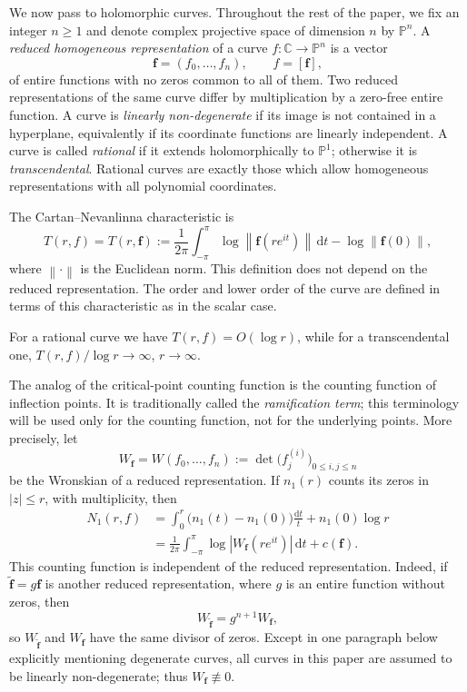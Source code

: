\documentclass[11pt,letterpaper,reqno]{amsart}
\theoremstyle{remark}
\numberwithin{equation}{section}
\newcommand{\C}{\mathbb C}
\newcommand{\PP}{\mathbb P}
\newcommand{\norm}[1]{\left\lVert#1\right\rVert}
\newcommand{\fv}{\bm f}
\begin{document}
We now pass to holomorphic curves. Throughout the rest of the paper,
we fix an integer $n\geq1$ and denote complex projective space of dimension $n$ by $\PP^n$. 
A \emph{reduced homogeneous representation} of a curve
$f:\C\to\PP^{n}$ is a vector
\[
 \fv=(f_0,\ldots,f_n),\qquad f=[\fv],
\]
of entire functions with no zeros common to all of them.
Two reduced representations of
the same curve differ by multiplication by a zero-free entire function.
A curve is \emph{linearly non-degenerate} if its image is not contained in
a hyperplane, equivalently if its coordinate functions are linearly
independent. A curve is called \emph{rational}
if it extends holomorphically to
$\PP^1$; otherwise it is \emph{transcendental}. Rational curves are exactly
those which allow homogeneous representations with all polynomial coordinates.

The Cartan--Nevanlinna characteristic is
\[
 T(r,f)=T(r,\fv):=
 \frac1{2\pi}\int_{-\pi}^{\pi}\log\norm{\fv(re^{it})}\,\mathrm dt
 -\log\norm{\fv(0)},
\]
where $\norm{\cdot}$ is the Euclidean norm. This definition does not
depend on the reduced representation. The order and lower order of the
curve are defined in terms of this characteristic as in the scalar case.

For a rational curve we have $T(r,f)=O(\log r)$, while for a transcendental
one,
$T(r,f)/\log r\to\infty$, $r\to\infty$.

The analog of the critical-point counting function is the counting
function of inflection points. It is traditionally called the \emph{ramification term}; this terminology
will be used only for the counting function, not for the underlying points. More precisely, let
\[
 W_{\fv}=W(f_0,\ldots,f_n)
 :=\det\bigl(f_j^{(i)}\bigr)_{0\leq i,j\leq n}
\]
be the Wronskian of a reduced representation. If $n_1(r)$ counts its zeros
in $|z|\leq r$, with multiplicity, then
\[
 \begin{split}
 N_1(r,f)&=\int_0^r\bigl(n_1(t)-n_1(0)\bigr)\frac{\mathrm dt}{t}
                 +n_1(0)\log r\\
 &=\frac1{2\pi}\int_{-\pi}^{\pi}\log|W_{\fv}(re^{it})|\,\mathrm dt+c(\fv).
 \end{split}
\]
This counting function is independent of the reduced representation.
Indeed, if $\widetilde{\fv}=g\fv$ is another reduced representation,
where $g$ is an entire function without zeros, then
\[
W_{\widetilde{\fv}}=g^{n+1}W_{\fv},
\]
so $W_{\widetilde{\fv}}$ and $W_{\fv}$ have the same divisor of zeros.
Except in one paragraph below explicitly mentioning degenerate curves, all
curves in this paper are assumed to be linearly non-degenerate; thus
$W_{\fv}\not\equiv0$.
\end{document}
